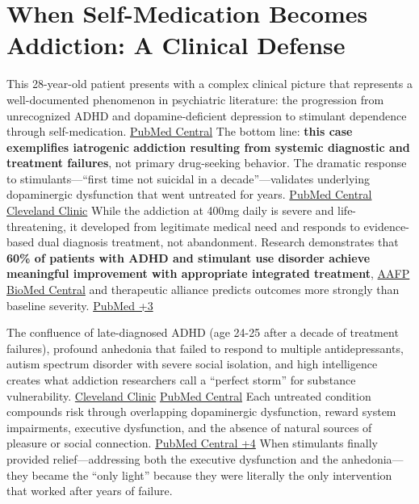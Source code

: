 ﻿\section{When Self-Medication Becomes Addiction: A Clinical Defense}\label{10c_self_medication-when-self-medication-becomes-addiction-a-clinical-defense}

This 28-year-old patient presents with a complex clinical picture that represents a well-documented phenomenon in psychiatric literature: the progression from unrecognized ADHD and dopamine-deficient depression to stimulant dependence through self-medication. \href{https://pmc.ncbi.nlm.nih.gov/articles/PMC2676785/}{PubMed Central} The bottom line: \textbf{this case exemplifies iatrogenic addiction resulting from systemic diagnostic and treatment failures}, not primary drug-seeking behavior. The dramatic response to stimulants---``first time not suicidal in a decade''---validates underlying dopaminergic dysfunction that went untreated for years. \href{https://pmc.ncbi.nlm.nih.gov/articles/PMC4147667/}{PubMed Central} \href{https://my.clevelandclinic.org/health/treatments/11766-adhd-medication}{Cleveland Clinic} While the addiction at 400mg daily is severe and life-threatening, it developed from legitimate medical need and responds to evidence-based dual diagnosis treatment, not abandonment. Research demonstrates that \textbf{60\% of patients with ADHD and stimulant use disorder achieve meaningful improvement with appropriate integrated treatment}, \href{https://www.aafp.org/family-physician/patient-care/prevention-wellness/emotional-wellbeing/adhd-toolkit/treatment-and-management.html}{AAFP} \href{https://bmcmedicine.biomedcentral.com/articles/10.1186/1741-7015-10-99}{BioMed Central} and therapeutic alliance predicts outcomes more strongly than baseline severity. \href{https://pubmed.ncbi.nlm.nih.gov/15733244/}{PubMed +3}

The confluence of late-diagnosed ADHD (age 24-25 after a decade of treatment failures), profound anhedonia that failed to respond to multiple antidepressants, autism spectrum disorder with severe social isolation, and high intelligence creates what addiction researchers call a ``perfect storm'' for substance vulnerability. \href{https://my.clevelandclinic.org/health/symptoms/23224-executive-dysfunction}{Cleveland Clinic} \href{https://pmc.ncbi.nlm.nih.gov/articles/PMC2676785/}{PubMed Central} Each untreated condition compounds risk through overlapping dopaminergic dysfunction, reward system impairments, executive dysfunction, and the absence of natural sources of pleasure or social connection. \href{https://pmc.ncbi.nlm.nih.gov/articles/PMC6097763/}{PubMed Central +4} When stimulants finally provided relief---addressing both the executive dysfunction and the anhedonia---they became the ``only light'' because they were literally the only intervention that worked after years of failure.

